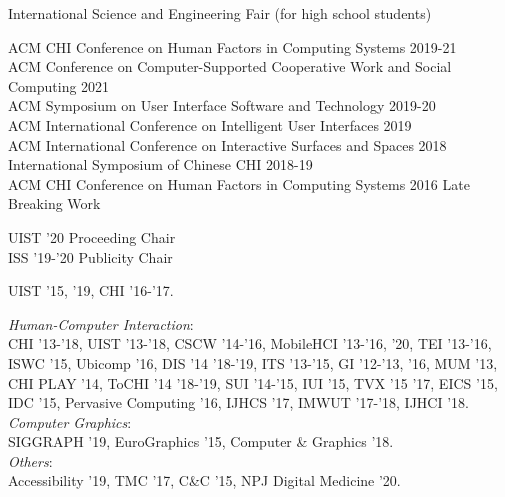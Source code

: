 

 {
	 {
			International Science and Engineering Fair (for high school students)
		}
}

 {
}

 {
	 {
		ACM CHI Conference on Human Factors in Computing Systems 2019-21\\
		ACM Conference on Computer-Supported Cooperative Work and Social Computing 2021\\
		ACM Symposium on User Interface Software and Technology 2019-20\\
		ACM International Conference on Intelligent User Interfaces 2019\\
		ACM International Conference on Interactive Surfaces and Spaces 2018\\
		International Symposium of Chinese CHI 2018-19\\
		ACM CHI Conference on Human Factors in Computing Systems 2016 Late Breaking Work
	}
}

 {
	 {
		UIST '20 Proceeding Chair\\
		ISS '19-'20 Publicity Chair\\
	}
}

 {
	 {
		UIST '15, '19, CHI '16-'17.
	}
}

 {
	 {
	\textit{Human-Computer Interaction}:\\
		CHI '13-'18, UIST '13-'18, CSCW '14-'16, MobileHCI '13-'16, '20, TEI '13-'16, ISWC '15, Ubicomp '16, DIS '14 '18-'19, ITS '13-'15, GI '12-'13, '16, MUM '13, CHI PLAY '14, ToCHI '14 '18-'19, SUI '14-'15, IUI '15, TVX '15 '17, EICS '15, IDC '15, Pervasive Computing '16, IJHCS '17, IMWUT '17-'18, IJHCI '18. \vspace{0.5em}\\
		\textit{Computer Graphics}:\\
		SIGGRAPH '19,  EuroGraphics '15, Computer \& Graphics '18. \vspace{0.5em}\\
		\textit{Others}:\\
		Accessibility '19, TMC '17, C\&C '15, NPJ Digital Medicine '20.
	}
}

